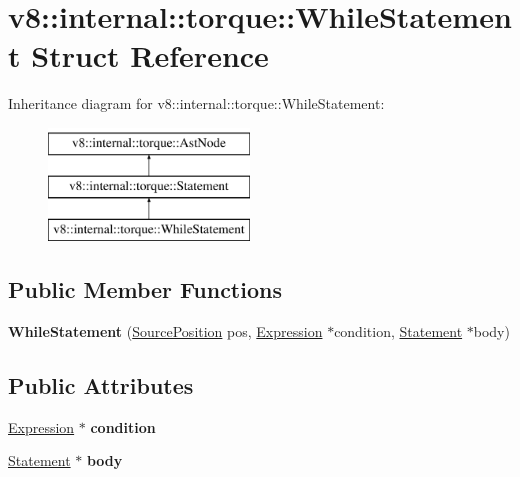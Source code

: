 \hypertarget{structv8_1_1internal_1_1torque_1_1WhileStatement}{}\section{v8\+:\+:internal\+:\+:torque\+:\+:While\+Statement Struct Reference}
\label{structv8_1_1internal_1_1torque_1_1WhileStatement}
Inheritance diagram for v8\+:\+:internal\+:\+:torque\+:\+:While\+Statement\+:\begin{figure}[H]
\begin{center}
\leavevmode
\includegraphics[height=3.000000cm]{structv8_1_1internal_1_1torque_1_1WhileStatement}
\end{center}
\end{figure}
\subsection*{Public Member Functions}
\begin{DoxyCompactItemize}
\item 
\mbox{\label{structv8_1_1internal_1_1torque_1_1WhileStatement_a95a27c89ecfefc20971d28b0a19442bd}} 
{\bfseries While\+Statement} (\mbox{\hyperlink{structv8_1_1internal_1_1torque_1_1SourcePosition}{Source\+Position}} pos, \mbox{\hyperlink{structv8_1_1internal_1_1torque_1_1Expression}{Expression}} $\ast$condition, \mbox{\hyperlink{structv8_1_1internal_1_1torque_1_1Statement}{Statement}} $\ast$body)
\end{DoxyCompactItemize}
\subsection*{Public Attributes}
\begin{DoxyCompactItemize}
\item 
\mbox{\label{structv8_1_1internal_1_1torque_1_1WhileStatement_a49b6b057fb077b2fd608917278f0a4f4}} 
\mbox{\hyperlink{structv8_1_1internal_1_1torque_1_1Expression}{Expression}} $\ast$ {\bfseries condition}
\item 
\mbox{\label{structv8_1_1internal_1_1torque_1_1WhileStatement_a68b511449296ff2192ea59016cdd4cc3}} 
\mbox{\hyperlink{structv8_1_1internal_1_1torque_1_1Statement}{Statement}} $\ast$ {\bfseries body}
\end{DoxyCompactItemize}

